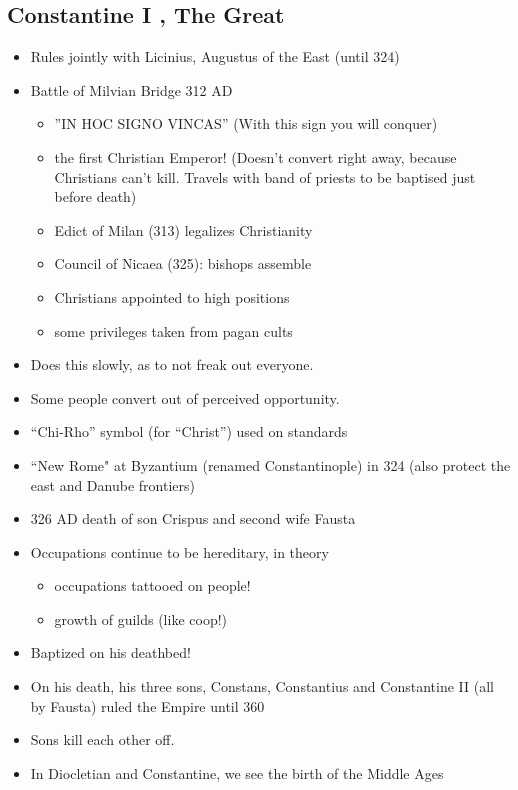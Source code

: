\documentclass[12pt, twoside]{article}
\begin{document}
\subsection{Constantine I , The Great}
\begin{itemize}
\item Rules jointly with Licinius, Augustus of the East (until 324)
\item Battle of Milvian Bridge 312 AD
	\begin{itemize}
	\item ”IN HOC SIGNO VINCAS” (With this sign you will conquer)
	\item the first Christian Emperor! (Doesn't convert right away, because Christians can't kill.  Travels with band of priests to be baptised just before death)
	\item Edict of Milan (313) legalizes Christianity
	\item Council of Nicaea (325): bishops assemble
	\item Christians appointed to high positions
	\item some privileges taken from pagan cults
	\end{itemize}
\item Does this slowly, as to not freak out everyone.
\item Some people convert out of perceived opportunity.
\item “Chi-Rho” symbol (for “Christ”) used on standards
\item “New Rome" at Byzantium (renamed Constantinople) in 324 (also protect the east and Danube frontiers)
\item 326 AD death of son Crispus and second wife Fausta
\item Occupations continue to be hereditary, in theory
	\begin{itemize}
	\item occupations tattooed on people!
	\item growth of guilds (like coop!)
	\end{itemize}
\item Baptized on his deathbed!
\item On his death, his three sons, Constans, Constantius and Constantine II (all by Fausta) ruled the Empire until 360
\item Sons kill each other off.
\item In Diocletian and Constantine, we see the birth of the Middle Ages
\end{itemize}
\end{document}

